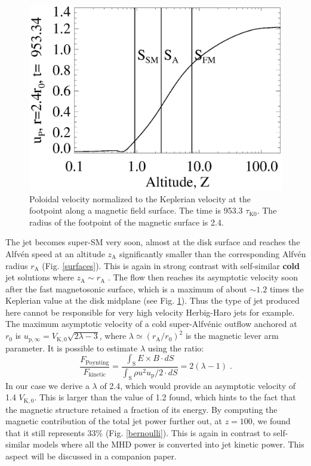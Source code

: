 \documentclass{aa}
\begin{document}
\begin{figure}
   \centering \includegraphics[width=\columnwidth]{12633f04.eps}
   \caption{ Poloidal velocity normalized to the Keplerian velocity at the footpoint along a magnetic field surface.  The time is 953.3 $\tau_\mathrm{K0}$.  The radius of the footpoint of the magnetic
	surface is 2.4.  }
              \label{fig:vpol}%
    \end{figure}

The jet becomes super-SM very soon, almost at the disk surface and reaches the Alfv\'en speed at an altitude $z_\mathrm{A}$ significantly smaller than the corresponding Alfv\'en radius $r_\mathrm{A}$ (Fig.
\ref{surfaces}). This is again in strong contrast with self-similar {\bf cold} jet solutions where $z_\mathrm{A} \sim r_\mathrm{A}$ \citep{1997A&A...319..340F}. The flow then reaches its asymptotic velocity soon after
the fast magnetosonic surface, which is a maximum of about $\sim 1.2$ times the Keplerian value at the disk midplane (see Fig. \ref{fig:vpol}).  Thus the type of jet produced here cannot be
responsible for very high velocity Herbig-Haro jets for example. The maximum asymptotic velocity of a cold super-Alfv\'enic outflow anchored at $r_0$ is 
$u_{\mathrm{p},\infty}= V_\mathrm{K,0} \sqrt{2\lambda - 3}$, where $\lambda \simeq (r_\mathrm{A}/r_0)^2$ is the magnetic lever arm parameter. It is possible to estimate $\lambda$ using the ratio:
\begin{equation}
\frac{F_\mathrm{Poynting}}{F_\mathrm{kinetic}}= \frac{ \int_\mathrm{S} E \times B \cdot dS}{ \int_\mathrm{S} \rho u^2 u_\mathrm{p}/2 \cdot dS} = 2(\lambda-1) \; .
\end{equation}
In our case we derive a $\lambda$ of 2.4, which would provide an asymptotic velocity of 1.4 $V_\mathrm{K,0}$. This is larger than the value of 1.2 found, which hints to the fact that the magnetic structure
retained a fraction of its energy.  By computing the magnetic contribution of the total jet power further out, at $z=100$, we found that it still represents 33\% (Fig. \ref{bernoulli}). This is
again in contrast to self-similar models where all the MHD power is converted into jet kinetic power. This aspect will be discussed in a companion paper.
\end{document}
